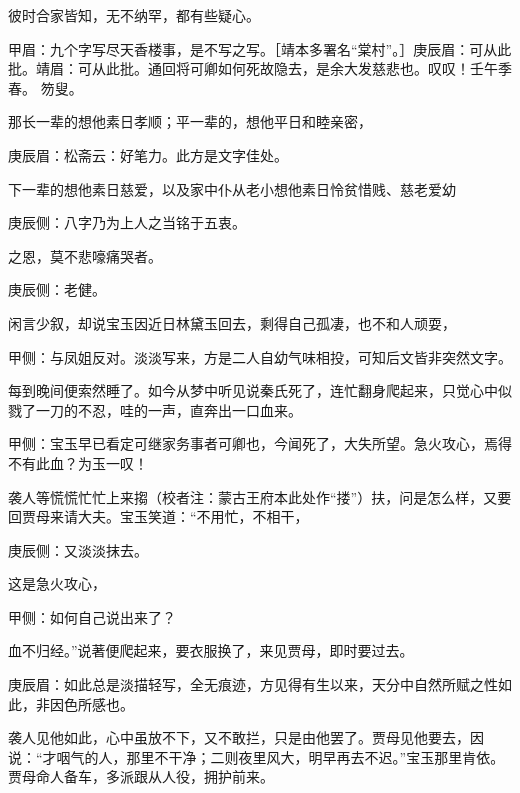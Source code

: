 \begin{parag}
    彼时合家皆知，无不纳罕，都有些疑心。\begin{note}甲眉：九个字写尽天香楼事，是不写之写。［靖本多署名“棠村”。］庚辰眉：可从此批。靖眉：可从此批。通回将可卿如何死故隐去，是余大发慈悲也。叹叹！壬午季春。 笏叟。\end{note}那长一辈的想他素日孝顺；平一辈的，想他平日和睦亲密，\begin{note}庚辰眉：松斋云：好笔力。此方是文字佳处。\end{note}下一辈的想他素日慈爱，以及家中仆从老小想他素日怜贫惜贱、慈老爱幼\begin{note}庚辰侧：八字乃为上人之当铭于五衷。\end{note}之恩，莫不悲嚎痛哭者。\begin{note}庚辰侧：老健。\end{note}
\end{parag}


\begin{parag}
    闲言少叙，却说宝玉因近日林黛玉回去，剩得自己孤凄，也不和人顽耍，\begin{note}甲侧：与凤姐反对。淡淡写来，方是二人自幼气味相投，可知后文皆非突然文字。\end{note}每到晚间便索然睡了。如今从梦中听见说秦氏死了，连忙翻身爬起来，只觉心中似戮了一刀的不忍，哇的一声，直奔出一口血来。\begin{note}甲侧：宝玉早已看定可继家务事者可卿也，今闻死了，大失所望。急火攻心，焉得不有此血？为玉一叹！\end{note}袭人等慌慌忙忙上来搊（校者注：蒙古王府本此处作“搂”）扶，问是怎么样，又要回贾母来请大夫。宝玉笑道：“不用忙，不相干，\begin{note}庚辰侧：又淡淡抹去。\end{note}这是急火攻心，\begin{note}甲侧：如何自己说出来了？\end{note}血不归经。”说著便爬起来，要衣服换了，来见贾母，即时要过去。\begin{note}庚辰眉：如此总是淡描轻写，全无痕迹，方见得有生以来，天分中自然所赋之性如此，非因色所感也。\end{note}袭人见他如此，心中虽放不下，又不敢拦，只是由他罢了。贾母见他要去，因说：“才咽气的人，那里不干净；二则夜里风大，明早再去不迟。”宝玉那里肯依。贾母命人备车，多派跟从人役，拥护前来。
\end{parag}


